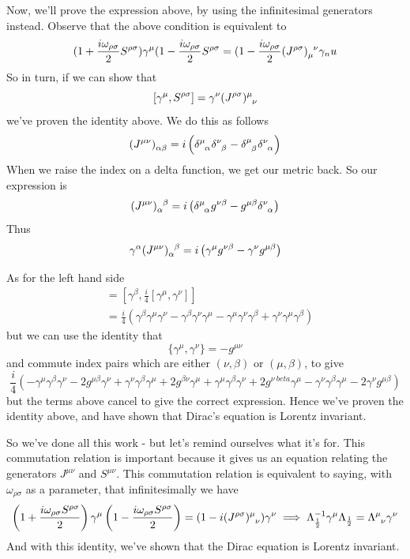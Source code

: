 \documentclass[11pt, oneside]{article}   	%
\theoremstyle{newline}
\theoremstyle{newline}
\theoremstyle{newline}
\theoremstyle{newline}
\theoremstyle{newline}
\begin{document}
Now, we'll prove the expression above, by using the infinitesimal generators instead. Observe that the above condition is equivalent to \[ 
( 1 + \frac{ i \omega_{ \rho \sigma} }{ 2} S^{ \rho \sigma} ) \gamma^\mu (1 - \frac{ i \omega_{ \rho \sigma }}{ 2} S^{ \rho \sigma} = ( 1 - \frac{ i \omega_{ \rho \sigma}}{ 2} ( J^{ \rho \sigma} )\indices{ _\mu^\nu}\gamma_nu \] So in turn, if we can show that \[ [\gamma^\mu, S^{\rho \sigma}] = \gamma^\nu (J^{\rho \sigma})\indices{^\mu_\nu} \] we've proven the identity above. We do this as follows 
\[ (J^{\mu \nu} )\indices{_\alpha_\beta}  = i \left( \delta\indices{^\mu_\alpha} \delta\indices{^\nu_\beta} - \delta\indices{^\mu_\beta}\delta\indices{^\nu_\alpha} \right)\]  
When we raise the index on a delta function, we get our metric back. So our expression is 
\[ (J^{\mu\nu})\indices{_\alpha^\beta} = i \left( \delta\indices{^\mu_\alpha} g^{\nu\beta} - g^{\mu\beta}\delta\indices{^\nu_\alpha} \right) \]
Thus \[ \gamma^\alpha (J^{\mu\nu} )\indices{_\alpha^\beta} = i \left( \gamma^\mu g^{\nu\beta} - \gamma^\nu g^{\mu\beta} \right) \]


As for the left hand side \begin{align*} [\gamma^\beta, S^{\mu\nu}] &= [\gamma^\beta, \frac{i}{4} [\gamma^\mu, \gamma^\nu]] \\ &= \frac{i}{4}\left( \gamma^\beta \gamma^\mu \gamma^\nu - \gamma^\beta \gamma^\nu \gamma^\mu - \gamma^\mu \gamma^\nu \gamma^\beta + \gamma^\nu \gamma^\mu \gamma^\beta \right) \end{align*} but we can use the identity that \[ \{ \gamma^\mu , \gamma^\nu \} = - g^{\mu\nu} \] and commute index pairs which are either $( \nu, \beta) $ or $ ( \mu, \beta ) $, to give 
\[ \frac{i} { 4} \left( - \gamma^\mu \gamma^\beta \gamma^\nu - 2g^{\mu \beta } \gamma^\nu  + \gamma^\nu \gamma^\beta \gamma^\mu + 2 g^{\beta \nu} \gamma^\mu + \gamma^\mu \gamma^\beta\gamma^\nu + 2 g^{ \nu \ beta } \gamma^\mu - \gamma^\nu \gamma^\beta \gamma^\mu - 2 \gamma^\nu g^{\mu \beta} \right) \] 
but the terms above cancel to give the correct expression. Hence we've proven the identity above, and have shown that Dirac's equation is Lorentz invariant.  

So we've done all this work - but let's remind ourselves what it's for. This commutation relation is important because it gives us an equation relating the generators $J^{\mu\nu}$ and $S^{ \mu \nu } $. This commutation relation is equivalent to saying, with $\omega_{\rho \sigma} $ as a parameter, that infinitesimally we have \[ \left(  1 + \frac{ i \omega_{ \rho \sigma } S^{ \rho \sigma} }{ 2} \right) \gamma^\mu \left( 1 - \frac{ i \omega_{ \rho\sigma} S^{ \rho \sigma }}{2} \right)  = ( 1 - i ( J^{ \rho \sigma } )\indices{^\mu_\nu})  \gamma^\nu \implies \Lambda_{ \frac{1}{2}}^{ -1} \gamma^\mu \Lambda_{ \frac{1}{2}}  = \Lambda\indices{^\mu_\nu}\gamma^\nu \]  
And with this identity, we've shown that the Dirac equation is Lorentz invariant. 
\end{document}
